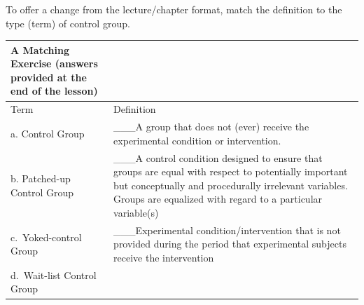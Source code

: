 \documentclass[
  english,
]{book}
\begin{document}
To offer a change from the lecture/chapter format, match the definition to the type (term) of control group.

\begin{longtable}[]{@{}ll@{}}
\toprule
\begin{minipage}[b]{0.28\columnwidth}\raggedright
A Matching Exercise (answers provided at the end of the lesson)\strut
\end{minipage} & \begin{minipage}[b]{0.66\columnwidth}\raggedright
\strut
\end{minipage}\tabularnewline
\midrule
\endhead
\begin{minipage}[t]{0.28\columnwidth}\raggedright
Term\strut
\end{minipage} & \begin{minipage}[t]{0.66\columnwidth}\raggedright
Definition\strut
\end{minipage}\tabularnewline
\begin{minipage}[t]{0.28\columnwidth}\raggedright
a. Control Group\strut
\end{minipage} & \begin{minipage}[t]{0.66\columnwidth}\raggedright
\_\_\_A group that does not (ever) receive the experimental condition or intervention.\strut
\end{minipage}\tabularnewline
\begin{minipage}[t]{0.28\columnwidth}\raggedright
b. Patched-up Control Group\strut
\end{minipage} & \begin{minipage}[t]{0.66\columnwidth}\raggedright
\_\_\_A control condition designed to ensure that groups are equal with respect to potentially important but conceptually and procedurally irrelevant variables. Groups are equalized with regard to a particular variable(s)\strut
\end{minipage}\tabularnewline
\begin{minipage}[t]{0.28\columnwidth}\raggedright
c.~Yoked-control Group\strut
\end{minipage} & \begin{minipage}[t]{0.66\columnwidth}\raggedright
\_\_\_Experimental condition/intervention that is not provided during the period that experimental subjects receive the intervention\strut
\end{minipage}\tabularnewline
\begin{minipage}[t]{0.28\columnwidth}\raggedright
d.~Wait-list Control Group\strut
\end{minipage} & \begin{minipage}[t]{0.66\columnwidth}\raggedright

\end{minipage}
\end{longtable}
\end{document}
